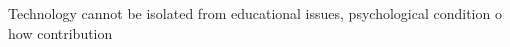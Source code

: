 \documentclass[12pt,MSc]{muthesis}
\begin{document}
%
Technology  cannot be isolated from educational issues, psychological condition o how contribution
%
%
%
%

\iffalse
\end{document}
